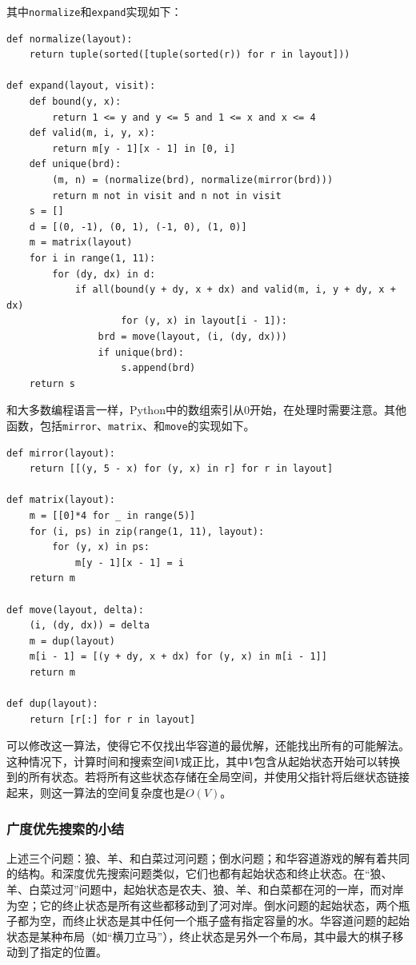 \documentclass[UTF8]{article}
\begin{document}
其中\texttt{normalize}和\texttt{expand}实现如下：

\lstset{language=Python}
\begin{lstlisting}
def normalize(layout):
    return tuple(sorted([tuple(sorted(r)) for r in layout]))

def expand(layout, visit):
    def bound(y, x):
        return 1 <= y and y <= 5 and 1 <= x and x <= 4
    def valid(m, i, y, x):
        return m[y - 1][x - 1] in [0, i]
    def unique(brd):
        (m, n) = (normalize(brd), normalize(mirror(brd)))
        return m not in visit and n not in visit
    s = []
    d = [(0, -1), (0, 1), (-1, 0), (1, 0)]
    m = matrix(layout)
    for i in range(1, 11):
        for (dy, dx) in d:
            if all(bound(y + dy, x + dx) and valid(m, i, y + dy, x + dx)
                    for (y, x) in layout[i - 1]):
                brd = move(layout, (i, (dy, dx)))
                if unique(brd):
                    s.append(brd)
    return s
\end{lstlisting}

和大多数编程语言一样，Python中的数组索引从0开始，在处理时需要注意。其他函数，包括\texttt{mirror}、\texttt{matrix}、和\texttt{move}的实现如下。

\lstset{language=Python}
\begin{lstlisting}
def mirror(layout):
    return [[(y, 5 - x) for (y, x) in r] for r in layout]

def matrix(layout):
    m = [[0]*4 for _ in range(5)]
    for (i, ps) in zip(range(1, 11), layout):
        for (y, x) in ps:
            m[y - 1][x - 1] = i
    return m

def move(layout, delta):
    (i, (dy, dx)) = delta
    m = dup(layout)
    m[i - 1] = [(y + dy, x + dx) for (y, x) in m[i - 1]]
    return m

def dup(layout):
    return [r[:] for r in layout]
\end{lstlisting}

可以修改这一算法，使得它不仅找出华容道的最优解，还能找出所有的可能解法。这种情况下，计算时间和搜索空间$V$成正比，其中$V$包含从起始状态开始可以转换到的所有状态。若将所有这些状态存储在全局空间，并使用父指针将后继状态链接起来，则这一算法的空间复杂度也是$O(V)$。

\subsubsection{广度优先搜索的小结}
 

上述三个问题：狼、羊、和白菜过河问题；倒水问题；和华容道游戏的解有着共同的结构。和深度优先搜索问题类似，它们也都有起始状态和终止状态。在“狼、羊、白菜过河”问题中，起始状态是农夫、狼、羊、和白菜都在河的一岸，而对岸为空；它的终止状态是所有这些都移动到了河对岸。倒水问题的起始状态，两个瓶子都为空，而终止状态是其中任何一个瓶子盛有指定容量的水。华容道问题的起始状态是某种布局（如“横刀立马”），终止状态是另外一个布局，其中最大的棋子移动到了指定的位置。
\end{document}
